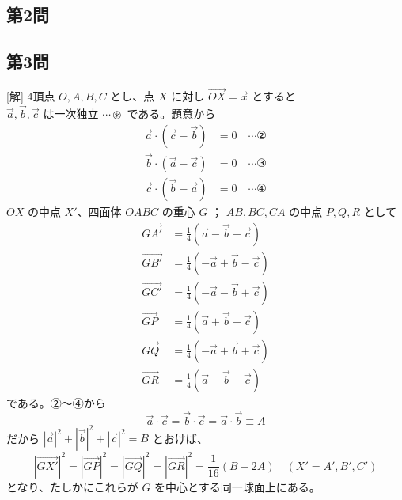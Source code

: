 \documentclass[../main.tex]{subfiles}
\begin{document}
\subsection*{第2問}

\subsection*{第3問}
[解] 4頂点 $O, A, B, C$ とし、点 $X$ に対し $\overrightarrow{OX} = \vec{x}$ とすると \\
$\vec{a}, \vec{b}, \vec{c}$ は一次独立 $\cdots \circledast$ である。題意から
\begin{align*}
  \vec{a} \cdot (\vec{c} - \vec{b}) &= 0 \quad \cdots \text{②} \\
  \vec{b} \cdot (\vec{a} - \vec{c}) &= 0 \quad \cdots \text{③} \\
  \vec{c} \cdot (\vec{b} - \vec{a}) &= 0 \quad \cdots \text{④}
\end{align*}
$OX$ の中点 $X'$、四面体 $OABC$ の重心 $G$ ； $AB, BC, CA$ の中点 $P, Q, R$ として
\begin{align*}
  \overrightarrow{GA'} &= \frac{1}{4} (\vec{a} - \vec{b} - \vec{c}) \\
  \overrightarrow{GB'} &= \frac{1}{4} (-\vec{a} + \vec{b} - \vec{c}) \\
  \overrightarrow{GC'} &= \frac{1}{4} (-\vec{a} - \vec{b} + \vec{c}) \\
  \overrightarrow{GP} &= \frac{1}{4} (\vec{a} + \vec{b} - \vec{c}) \\
  \overrightarrow{GQ} &= \frac{1}{4} (-\vec{a} + \vec{b} + \vec{c}) \\
  \overrightarrow{GR} &= \frac{1}{4} (\vec{a} - \vec{b} + \vec{c})
\end{align*}
である。②〜④から
\[ \vec{a} \cdot \vec{c} = \vec{b} \cdot \vec{c} = \vec{a} \cdot \vec{b} \equiv A \]
だから $|\vec{a}|^2 + |\vec{b}|^2 + |\vec{c}|^2 = B$ とおけば、
\[ |\overrightarrow{GX'}|^2 = |\overrightarrow{GP}|^2 = |\overrightarrow{GQ}|^2 = |\overrightarrow{GR}|^2 = \frac{1}{16} (B - 2A) \quad (X' = A', B', C') \]
となり、たしかにこれらが $G$ を中心とする同一球面上にある。
\begin{center}
\end{center}
\end{document}
